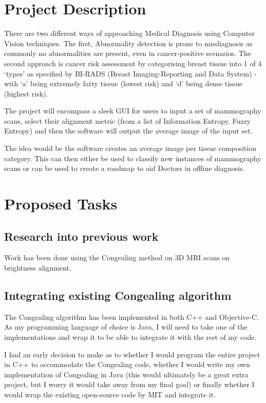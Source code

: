 \documentclass[a4paper,11pt]{report}
\begin{document}
% 

\chapter{Project Description}
\label{chap:desc}

There are two different ways of approaching Medical Diagnosis using Computer Vision techniques. The first, Abnormality detection is prone to misdiagnosis as commonly no abnormalities are present, even in cancer-positive scenarios. The second approach is cancer risk assessment by categorising breast tissue into 1 of 4 `types' as specified by BI-RADS (Breast Imaging-Reporting and Data System) - with `a' being extremely fatty tissue (lowest risk) and `d' being dense tissue (highest risk).

The project will encompass a sleek GUI for users to input a set of mammography scans, select their alignment metric (from a list of Information Entropy, Fuzzy Entropy) and then the software will output the average image of the input set. 

The idea would be the software creates an average image per tissue composition category. This can then either be used to classify new instances of mammography scans or can be used to create a roadmap to aid Doctors in offline diagnosis.

\chapter{Proposed Tasks}
\label{chap:tasks}

\section{Research into previous work}
Work has been done using the Congealing method on 3D MRI scans on brightness alignment. 

\section{Integrating existing Congealing algorithm}

The Congealing algorithm has been implemented in both C++ and Objective-C. As my programming language of choice is Java, I will need to take one of the implementations and wrap it to be able to integrate it with the rest of my code. 

I had an early decision to make as to whether I would program the entire project in C++ to accommodate the Congealing code, whether I would write my own implementation of Congealing in Java (this would ultimately be a great extra project, but I worry it would take away from my final goal) or finally whether I would wrap the existing open-source code by MIT and integrate it.
\end{document}
